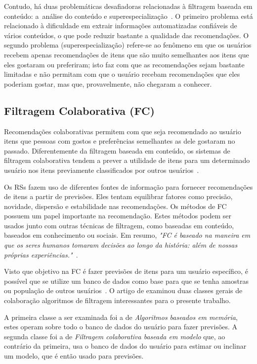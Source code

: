 Contudo, há duas problemáticas desafiadoras relacionadas à filtragem baseada em conteúdo: a análise do conteúdo e superespecialização~\cite{adomavicius2005toward}. O primeiro problema está relacionado à dificuldade em extrair informações automatizadas confiáveis de vários conteúdos, o que pode reduzir bastante a qualidade das recomendações. O segundo problema (superespecialização) refere-se ao fenômeno em que os usuários recebem apenas recomendações de itens que são muito semelhantes aos itens que eles gostaram ou preferiram; isto faz com que as recomendações sejam bastante limitadas e não permitam com que o usuário recebam recomendações que eles poderiam gostar, mas que, provavelmente, não chegaram a conhecer. 

\subsection{Filtragem Colaborativa (FC)}

Recomendações colaborativas permitem com que seja recomendado ao usuário itens que pessoas com gostos e preferências semelhantes as dele gostaram no passado. Diferentemente da filtragem baseada em conteúdo, os sistemas de filtragem colaborativa tendem a prever a utilidade de itens para um determinado usuário nos itens previamente classificados por outros usuários~\cite{adomavicius2005toward}. 	

Os RSs fazem uso de diferentes fontes de informação para fornecer recomendações de itens a partir de previsões. Eles tentam equilibrar fatores como precisão, novidade, dispersão e estabilidade nas recomendações. Os métodos de FC possuem um papel importante na recomendação. Estes métodos podem ser usados junto com outras técnicas de filtragem, como baseadas em conteúdo,
baseados em conhecimento ou sociais. Em resumo, \textit{"FC é baseado na maneira em que os seres humanos tomaram decisões ao longo da história: além de nossas próprias experiências."}~\cite{bobadilla2013recommender}.

Visto que objetivo na FC é fazer previsões de itens para um usuário específico, é possível que se utilize um banco de dados como base para que se tenha amostras ou população de outros usuários~\cite{breese1998empirical}. O artigo de \cite{breese1998empirical} examinou duas classes gerais de colaboração algoritmos de filtragem interessantes para o presente trabalho. 

A primeira classe a ser examinada foi a de \textit{Algoritmos baseados em memória}, estes operam sobre todo o banco de dados do usuário para fazer previsões. A segunda classe foi a de \textit{Filtragem colaborativa baseada em modelo} que, ao contrário da primeira, usa o banco de dados do usuário para estimar ou inclinar um modelo, que é então usado para previsões. 

